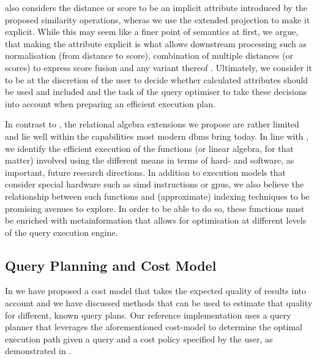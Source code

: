 \cite{Giangreco:2018Database} also considers the distance or score to be an implicit attribute introduced by the proposed similarity operations, wheras we use the extended projection to make it explicit. While this may seem like a finer point of semantics at first, we argue, that making the attribute explicit is what allows downstream processing such as normalisation (from distance to score), combination of multiple distances (or scores) to express score fusion and any variant thereof \cite{Bohm:2001Fast}. Ultimately, we consider it to be at the discretion of the user to decide whether calculated attributes should be used and included and the task of the query optimiser to take these decisions into account when preparing an efficient execution plan.

In contrast to \cite{Giangreco:2018Database}, the relational algebra extensions we propose are rather limited and lie well within the capabilities most modern \acrshort{dbms} bring today. In line with , we identify the efficient execution of the functions (or linear algebra, for that matter) involved using the different means in terms of hard- and software, as important, future research directions. In addition to execution models that consider special hardware such as \acrshort{simd} instructions or \acrshort{gpu}s, we also believe the relationship between such functions and (approximate) indexing techniques to be promising avenues to explore. In order to be able to do so, these functions must be enriched with metainformation that allows for optimisation at different levels of the query execution engine.

\subsection{Query Planning and Cost Model}  
In  we have proposed a cost model that takes the expected quality of results into account and we have discussed methods that can be used to estimate that quality for different, known query plans. Our reference implementation \cottontail{} uses a query planner that leverages the aforementioned cost-model to determine the optimal execution path given a query and a cost policy specified by the user, as demonstrated in .

